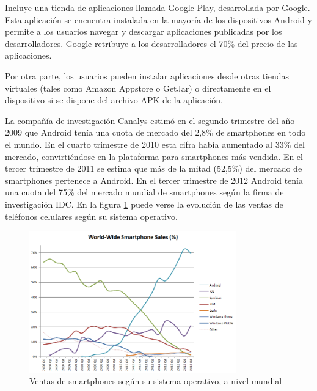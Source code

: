 Incluye una tienda de aplicaciones llamada Google Play, desarrollada por Google. Esta aplicación se encuentra instalada en la mayoría de los dispositivos Android y permite a los usuarios navegar y descargar aplicaciones publicadas por los desarrolladores. Google retribuye a los desarrolladores el 70\% del precio de las aplicaciones.

Por otra parte, los usuarios pueden instalar aplicaciones desde otras tiendas virtuales (tales como Amazon Appstore o GetJar) o directamente en el dispositivo si se dispone del archivo APK de la aplicación.

La compañía de investigación Canalys estimó en el segundo trimestre del año 2009 que Android tenía una cuota de mercado del 2,8\% de smartphones en todo el mundo. En el cuarto trimestre de 2010 esta cifra había aumentado al 33\% del mercado, convirtiéndose en la plataforma para smartphones más vendida. En el tercer trimestre de 2011 se estima que más de la mitad (52,5\%) del mercado de smartphones pertenece a Android. En el tercer trimestre de 2012 Android tenía una cuota del 75\% del mercado mundial de smartphones según la firma de investigación IDC. En la figura \ref{fig:ventas-android} puede verse la evolución de las ventas de teléfonos celulares según su sistema operativo.

\begin{figure}[htbp]
  \centering
    \includegraphics[width=0.8\textwidth]{imagenes/ventasAndroid.png}
     \caption{Ventas de smartphones según su sistema operativo, a nivel mundial}
    \label{fig:ventas-android}
\end{figure}


